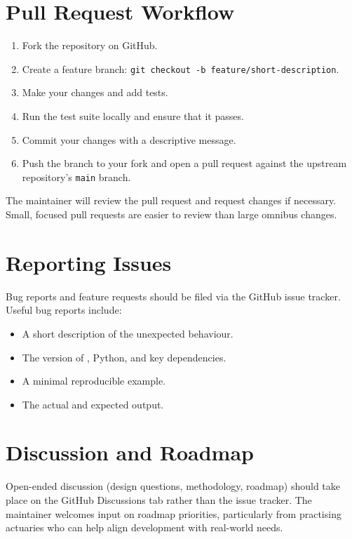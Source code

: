 \section{Pull Request Workflow}

\begin{enumerate}[leftmargin=*]
    \item Fork the repository on GitHub.
    \item Create a feature branch:
          \texttt{git checkout -b feature/short-description}.
    \item Make your changes and add tests.
    \item Run the test suite locally and ensure that it passes.
    \item Commit your changes with a descriptive message.
    \item Push the branch to your fork and open a pull request against
          the upstream repository's \texttt{main} branch.
\end{enumerate}

The maintainer will review the pull request and request changes if
necessary. Small, focused pull requests are easier to review than large
omnibus changes.

\section{Reporting Issues}

Bug reports and feature requests should be filed via the GitHub issue
tracker. Useful bug reports include:

\begin{itemize}[leftmargin=*]
    \item A short description of the unexpected behaviour.
    \item The version of \actsim, Python, and key dependencies.
    \item A minimal reproducible example.
    \item The actual and expected output.
\end{itemize}

\section{Discussion and Roadmap}

Open-ended discussion (design questions, methodology, roadmap) should
take place on the GitHub Discussions tab rather than the issue tracker.
The maintainer welcomes input on roadmap priorities, particularly from
practising actuaries who can help align development with real-world
needs.
